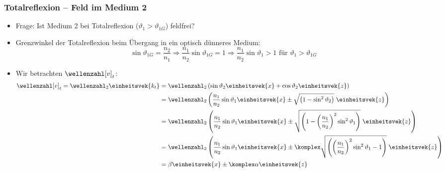 \begin{frame}
  \frametitle{Totalreflexion -- Feld im Medium 2}  
  \begin{itemize}[<+->]
       \item Frage: Ist Medium 2 bei Totalreflexion (\(\vartheta_1> \vartheta_{1G}\)) feldfrei? 
  \item \alert{Grenzwinkel der Totalreflexion} beim \alert{Übergang in ein optisch dünneres Medium}:
         \begin{equation*}
           \sin\vartheta_{1G} = \frac{n_2}{n_1} \Rightarrow \frac{n_1}{n_2}\sin\vartheta_{1G} = 1 \Rightarrow \boxed{\frac{n_1}{n_2}\sin\vartheta_{1} > 1 \text{ für } \vartheta_{1}>\vartheta_{1G}}
         \end{equation*}
       \item Wir betrachten \(\wellenzahl[v]_t\):
         \begin{align*}
           \wellenzahl[v]_t=\wellenzahl_2 \einheitsvek{k_t} &= \wellenzahl_2 \left( \sin\vartheta_2\einheitsvek{x} +   \cos\vartheta_2\einheitsvek{z}\right) \\
                                                        &= \wellenzahl_2 \left(\frac{n_1}{n_2} \sin\vartheta_1\einheitsvek{x} \pm \sqrt{\left(1-   \sin^2\vartheta_2\right)}\;\einheitsvek{z}\right)\\
                                                        &= \wellenzahl_2 \left(\frac{n_1}{n_2} \sin\vartheta_1\einheitsvek{x} \pm \sqrt{\left(1-  \left(\frac{n_1}{n_2}\right)^2 \sin^2\vartheta_1\right)}\;\einheitsvek{z}\right)\\
                                                        &= \wellenzahl_2 \left(\frac{n_1}{n_2} \sin\vartheta_1\einheitsvek{x} \pm \komplex\sqrt{\left( \left(\frac{n_1}{n_2}\right)^2 \sin^2\vartheta_1-1\right)}\;\einheitsvek{z}\right)\\
           &= \beta \einheitsvek{x} \pm \komplex \alpha \einheitsvek{z} 
           \end{align*}
\end{itemize}
\end{frame}

